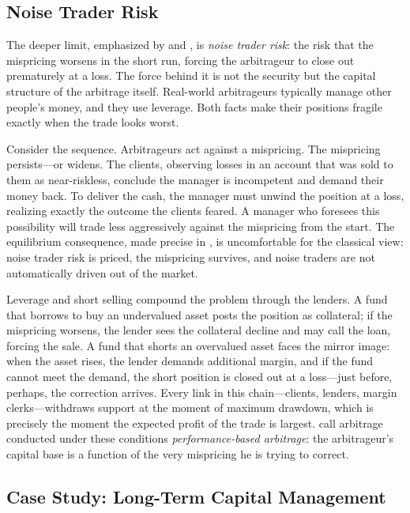 \subsection{Noise Trader Risk}
\label{sec:noisetrader}

The deeper limit, emphasized by \citet{delong1990} and \citet{shleifer1997}, is \emph{noise trader risk}: the risk that the mispricing worsens in the short run, forcing the arbitrageur to close out prematurely at a loss. The force behind it is not the security but the capital structure of the arbitrage itself. Real-world arbitrageurs typically manage other people's money, and they use leverage. Both facts make their positions fragile exactly when the trade looks worst.

Consider the sequence. Arbitrageurs act against a mispricing. The mispricing persists---or widens. The clients, observing losses in an account that was sold to them as near-riskless, conclude the manager is incompetent and demand their money back. To deliver the cash, the manager must unwind the position at a loss, realizing exactly the outcome the clients feared. A manager who foresees this possibility will trade less aggressively against the mispricing from the start. The equilibrium consequence, made precise in \citet{delong1990}, is uncomfortable for the classical view: noise trader risk is priced, the mispricing survives, and noise traders are not automatically driven out of the market.

Leverage and short selling compound the problem through the lenders. A fund that borrows to buy an undervalued asset posts the position as collateral; if the mispricing worsens, the lender sees the collateral decline and may call the loan, forcing the sale. A fund that shorts an overvalued asset faces the mirror image: when the asset rises, the lender demands additional margin, and if the fund cannot meet the demand, the short position is closed out at a loss---just before, perhaps, the correction arrives. Every link in this chain---clients, lenders, margin clerks---withdraws support at the moment of maximum drawdown, which is precisely the moment the expected profit of the trade is largest. \citet{shleifer1997} call arbitrage conducted under these conditions \emph{performance-based arbitrage}: the arbitrageur's capital base is a function of the very mispricing he is trying to correct.

\subsection{Case Study: Long-Term Capital Management}
\label{sec:ltcm}

